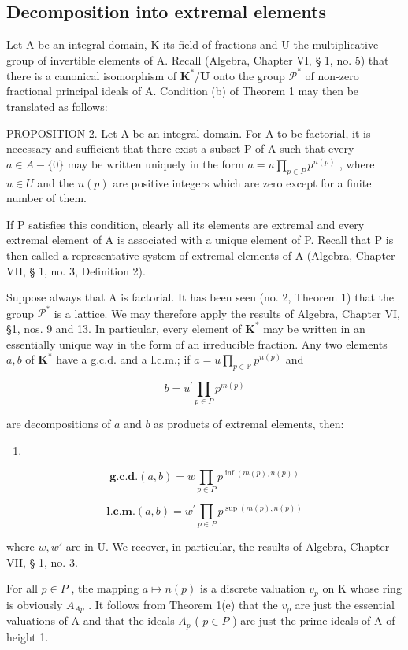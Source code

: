 \subsection{Decomposition into extremal elements}

Let A be an integral domain, K its field of fractions and U the multiplicative group of invertible elements of A. Recall (Algebra, Chapter VI, § 1, no. 5) that there is a canonical isomorphism of \(\mathbf{K}^* / \mathbf{U}\) onto the group \(\mathcal{P}^*\) of non-zero fractional principal ideals of A. Condition (b) of Theorem 1 may then be translated as follows:

PROPOSITION 2. Let A be an integral domain. For A to be factorial, it is necessary and sufficient that there exist a subset P of A such that every \(a \in A - \{0\}\) may be written uniquely in the form \(a = u \prod_{p \in P} p^{n(p)}\) , where \(u \in U\) and the \(n(p)\) are positive integers which are zero except for a finite number of them.

If P satisfies this condition, clearly all its elements are extremal and every extremal element of A is associated with a unique element of P. Recall that P is then called a representative system of extremal elements of A (Algebra, Chapter VII, § 1, no. 3, Definition 2).

Suppose always that A is factorial. It has been seen (no. 2, Theorem 1) that the group \(\mathcal{P}^*\) is a lattice. We may therefore apply the results of Algebra, Chapter VI, §1, nos. 9 and 13. In particular, every element of \(\mathbf{K}^*\) may be written in an essentially unique way in the form of an irreducible fraction. Any
two elements \(a, b\) of \(\mathbf{K}^*\) have a g.c.d. and a l.c.m.; if \(a = u\prod_{p\in \mathbb{P}}p^{n(p)}\) and

\[
b = u ^ {\prime} \prod_ {p \in P} p ^ {m (p)}
\]

are decompositions of \(a\) and \(b\) as products of extremal elements, then:

\begin{enumerate}
\def\labelenumi{(\arabic{enumi})}
\tightlist
\item
\end{enumerate}

\[
\mathbf {g . c . d .} (a, b) = w \prod_ {p \in P} p ^ {\inf (m (p), n (p))}\tag{2}
\]

\[
\mathbf {l . c . m .} (a, b) = w ^ {\prime} \prod_ {p \in P} p ^ {\sup (m (p), n (p))}
\]

where \(w, w'\) are in U. We recover, in particular, the results of Algebra, Chapter VII, § 1, no. 3.

For all \(p \in P\) , the mapping \(a \mapsto n(p)\) is a discrete valuation \(v_{p}\) on K whose ring is obviously \(A_{Ap}\) . It follows from Theorem 1(e) that the \(v_{p}\) are just the essential valuations of A and that the ideals \(A_{p}\) ( \(p \in P\) ) are just the prime ideals of A of height 1.

